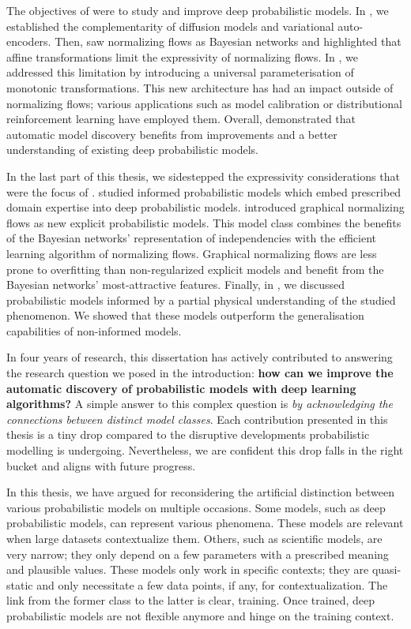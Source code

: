 The objectives of  were to study and improve deep probabilistic models. In , we established the complementarity of diffusion models and variational auto-encoders. Then,  saw normalizing flows as Bayesian networks and highlighted that affine transformations limit the expressivity of normalizing flows. In , we addressed this limitation by introducing a universal parameterisation of monotonic transformations. This new architecture has had an impact outside of normalizing flows; various applications such as model calibration or distributional reinforcement learning have employed them. Overall,  demonstrated that automatic model discovery benefits from improvements and a better understanding of existing deep probabilistic models.

In the last part of this thesis, we sidestepped the expressivity considerations that were the focus of .   studied informed probabilistic models which embed prescribed domain expertise into deep probabilistic models.  introduced graphical normalizing flows as new explicit probabilistic models. This model class combines the benefits of the Bayesian networks' representation of independencies with the efficient learning algorithm of normalizing flows. Graphical normalizing flows are less prone to overfitting than non-regularized explicit models and benefit from the Bayesian networks' most-attractive features. Finally, in , we discussed probabilistic models informed by a partial physical understanding of the studied phenomenon. We showed that these models outperform the generalisation capabilities of non-informed models. %

In four years of research, this dissertation has actively contributed to answering the research question we posed in the introduction: \textbf{how can we improve the automatic discovery of probabilistic models with deep learning algorithms?} A simple answer to this complex question is \textit{by acknowledging the connections between distinct model classes}. Each contribution presented in this thesis is a tiny drop compared to the disruptive developments probabilistic modelling is undergoing. Nevertheless, we are confident this drop falls in the right bucket and aligns with future progress.

In this thesis, we have argued for reconsidering the artificial distinction between various probabilistic models on multiple occasions. Some models, such as deep probabilistic models, can represent various phenomena. These models are relevant when large datasets contextualize them. Others, such as scientific models, are very narrow; they only depend on a few parameters with a prescribed meaning and plausible values. These models only work in specific contexts; they are quasi-static and only necessitate a few data points, if any, for contextualization. The link from the former class to the latter is clear, training. Once trained, deep probabilistic models are not flexible anymore and hinge on the training context.

